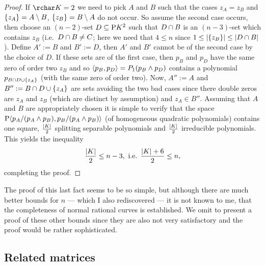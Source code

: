 \begin{proof}
    If $\rchar K = 2$ we need to pick $A$ and $B$ such that the cases 
    $z_A=z_B$ and $\set{z_A}=A\setminus B$, $\set{z_B}=B\setminus A$ do not occur. So assume the second case occurs, then choose an $(n-2)$-set $D\setleq\P K^2$ such that $D\cap B$ is an $(n-3)$-set which contains $z_B$ (i.e.~$D\cap B\not= C$; here we need that $4\leq n$ since $1\leq\card{\set{z_B}}\leq\card{D\setmeet B}$). Define $A':=B$ and $B':=D$, then $A'$ and $B'$ cannot be of the second case by the choice of $D$. If these sets are of the first case, then $p_B$ and $p_D$ have the same zero of order two $z_B$ and so $\gen{p_B,p_D}=P_1(p_B\meet p_D)$ contains a polynomial $p_{B\setmeet D\setjoin\set{z_A}}$ (with the same zero of order two). Now, $A'':=A$ and $B'':=B\setmeet D\setjoin\set{z_A}$ are sets avoiding the two bad cases since there double zeros are $z_A$ and $z_B$ (which are distinct by assumption) and $z_A\in B''$.
    Assuming that $A$ and $B$ are appropriately chosen it is simple to verify that the space $\P\gen{p_A/(p_A\meet p_B),p_B/(p_A\meet p_B)}$ (of homogeneous quadratic polynomials) contains one square, $\frac{\left\vert{K}\right\vert} 2$ splitting separable polynomials and $\frac{\left\vert{K}\right\vert} 2$ irreducible polynomials.
    This yields the inequality
    $$
    \frac{\left\vert{K}\right\vert} 2 \leq n-3, \text{ i.e. } \frac{\left\vert{K}\right\vert+6} 2\leq n,
    $$
    completing the proof.
\end{proof}

The proof of this last fact seems to be so simple, but although there are much better bounds for $n$ --- which I also rediscovered --- it is not known to me, that the completeness of normal rational curves is established.
We omit to present a proof of these other bounds since they are also not very satisfactory and the proof would be rather sophisticated.


\subsection{Related matrices}

